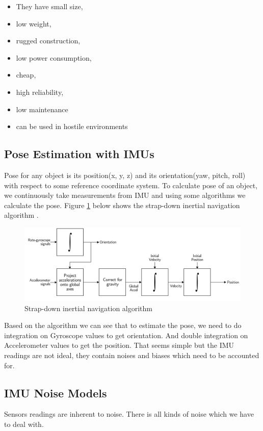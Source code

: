 \begin{itemize}
\item They have small size, 
\item low weight, 
\item rugged construction, 
\item low power consumption, 
\item cheap, 
\item high reliability, 
\item low maintenance
\item can be used in hostile environments 
\end{itemize}



\subsection{Pose Estimation with IMUs}
Pose for any object is its position(x, y, z) and its orientation(yaw, pitch, roll) with respect to some reference coordinate system. To calculate pose of an object, we continuously take measurements from IMU and using some algorithms we calculate the pose. Figure \ref{fig:strapdown_imu} below shows the strap-down inertial navigation algorithm \citep{woodman2007introduction}.

\begin{figure}
\includegraphics[scale=0.22]{images/fig_chapter1/strap_imu_algo.png}
\caption{Strap-down inertial navigation algorithm}
\label{fig:strapdown_imu}
\end{figure}

Based on the algorithm we can see that to estimate the pose, we need to do integration on Gyroscope values to get orientation. And double integration on Accelerometer values to get the position. That seems simple but the IMU readings are not ideal, they contain noises and biases \citep{woodman2007introduction} which need to be accounted for.

\subsection{IMU Noise Models}
Sensors readings are inherent to noise. There is all kinds of noise which we have to deal with.

